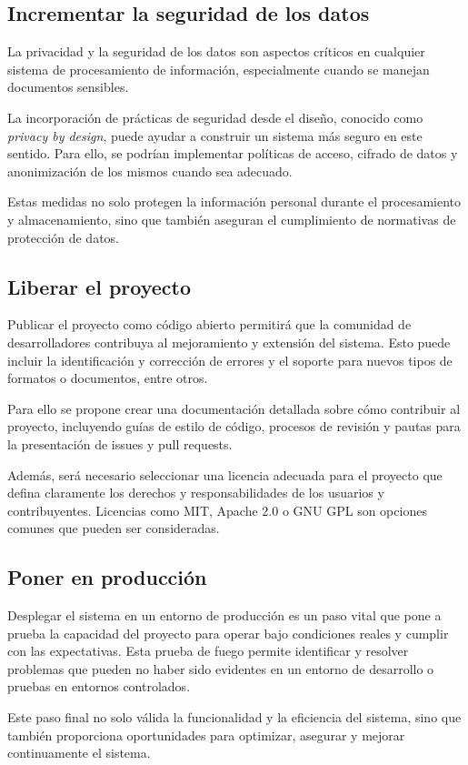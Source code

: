 \subsection*{Incrementar la seguridad de los datos}

La privacidad y la seguridad de los datos son aspectos críticos en cualquier sistema de procesamiento de información,
especialmente cuando se manejan documentos sensibles.

La incorporación de prácticas de seguridad desde el diseño, conocido como \textit{privacy by design}, puede ayudar a
construir un sistema más seguro en este sentido.
Para ello, se podrían implementar políticas de acceso, cifrado de datos y anonimización de los mismos cuando sea
adecuado.

Estas medidas no solo protegen la información personal durante el procesamiento y almacenamiento, sino que también
aseguran el cumplimiento de normativas de protección de datos.

\subsection*{Liberar el proyecto}

Publicar el proyecto como código abierto permitirá que la comunidad de desarrolladores contribuya al mejoramiento y
extensión del sistema.
Esto puede incluir la identificación y corrección de errores y el soporte para nuevos tipos de formatos o documentos,
entre otros.

Para ello se propone crear una documentación detallada sobre cómo contribuir al proyecto, incluyendo guías de estilo
de código, procesos de revisión y pautas para la presentación de issues y pull requests.

Además, será necesario seleccionar una licencia adecuada para el proyecto que defina claramente los derechos y
responsabilidades de los usuarios y contribuyentes.
Licencias como MIT, Apache 2.0 o GNU GPL son opciones comunes que pueden ser consideradas.

\subsection*{Poner en producción}

Desplegar el sistema en un entorno de producción es un paso vital que pone a prueba la capacidad del proyecto para
operar bajo condiciones reales y cumplir con las expectativas.
Esta prueba de fuego permite identificar y resolver problemas que pueden no haber sido evidentes en un entorno de
desarrollo o pruebas en entornos controlados.

Este paso final no solo válida la funcionalidad y la eficiencia del sistema, sino que también proporciona oportunidades
para optimizar, asegurar y mejorar continuamente el sistema.